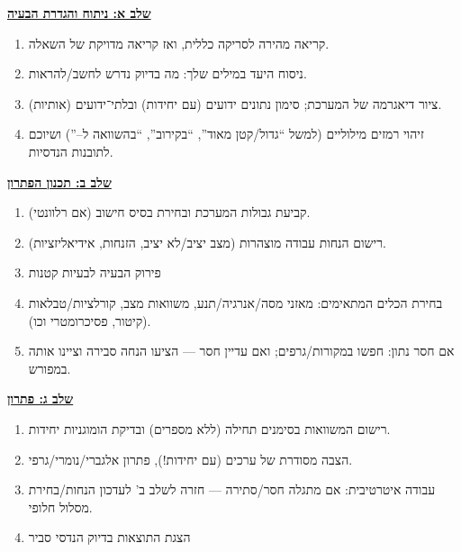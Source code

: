 \documentclass[
  hebrew,
  letterpaper,
  DIV=11,
  numbers=noendperiod]{scrreprt}
\begin{document}
\begin{tcolorbox}[enhanced jigsaw, colback=white, arc=.35mm, coltitle=black, breakable, toptitle=1mm, leftrule=.75mm, colbacktitle=quarto-callout-tip-color!10!white, opacitybacktitle=0.6, bottomtitle=1mm, titlerule=0mm, opacityback=0, colframe=quarto-callout-tip-color-frame, title=\textcolor{quarto-callout-tip-color}{\faLightbulb}\hspace{0.5em}{עצה}, rightrule=.15mm, bottomrule=.15mm, toprule=.15mm, left=2mm]

\textbf{{\ul{שלב א: ניתוח והגדרת הבעיה}}}

\begin{enumerate}
\def\labelenumi{\arabic{enumi}.}
\item
  {קריאה מהירה לסריקה כללית, ואז קריאה מדויקת של השאלה}.
\item
  {ניסוח היעד במילים שלך: מה בדיוק נדרש לחשב/להראות}.
\item
  {ציור דיאגרמה של המערכת; סימון נתונים ידועים (עם יחידות) ובלתי־ידועים
  (אותיות)}.
\item
  {זיהוי רמזים מילוליים (למשל ``גדול/קטן מאוד'', ``בקירוב'', ``בהשוואה
  ל--'') ושיוכם לתובנות הנדסיות}.
\end{enumerate}

\textbf{{\ul{שלב ב: תכנון הפתרון}}}

\begin{enumerate}
\def\labelenumi{\arabic{enumi}.}
\item
  {קביעת גבולות המערכת ובחירת בסיס חישוב (אם רלוונטי)}.
\item
  {רישום הנחות עבודה מוצהרות (מצב יציב/לא יציב, הזנחות, אידיאליזציות)}.
\item
  {פירוק הבעיה לבעיות קטנות}
\item
  {בחירת הכלים המתאימים: מאזני מסה/אנרגיה/תנע, משוואות מצב,
  קורלציות/טבלאות (קיטור, פסיכרומטרי וכו\textquotesingle)}.
\item
  {אם חסר נתון: חפשו במקורות/גרפים; ואם עדיין חסר --- הציעו הנחה סבירה
  וציינו אותה במפורש}.
\end{enumerate}

\textbf{{\ul{שלב ג: פתרון}}}

\begin{enumerate}
\def\labelenumi{\arabic{enumi}.}
\item
  {רישום המשוואות בסימנים תחילה (ללא מספרים) ובדיקת הומוגניות יחידות}.
\item
  {הצבה מסודרת של ערכים (עם יחידות!), פתרון אלגברי/נומרי/גרפי.}
\item
  {עבודה איטרטיבית: אם מתגלה חסר/סתירה --- חזרה לשלב ב' לעדכון
  הנחות/בחירת מסלול חלופי}.
\item
  {הצגת התוצאות בדיוק הנדסי סביר}
\end{enumerate}


\end{tcolorbox}
\end{document}
